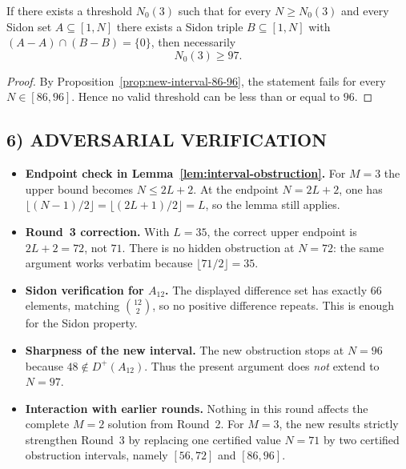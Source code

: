 \begin{corollary}[New lower bound on any eventual threshold for \(M=3\)]\label{cor:N0-lower-bound}
If there exists a threshold \(N_0(3)\) such that for every \(N\ge N_0(3)\) and every Sidon set \(A\subseteq[1,N]\) there exists a Sidon triple \(B\subseteq[1,N]\) with
\((A-A)\cap(B-B)=\{0\}\), then necessarily
\[
N_0(3)\ge 97.
\]
\end{corollary}

\begin{proof}
By Proposition~\ref{prop:new-interval-86-96}, the statement fails for every \(N\in[86,96]\).  Hence no valid threshold can be less than or equal to \(96\).
\end{proof}

\subsection{6) ADVERSARIAL VERIFICATION}
\begin{itemize}
  \item \textbf{Endpoint check in Lemma~\ref{lem:interval-obstruction}.}
  For \(M=3\) the upper bound becomes \(N\le 2L+2\).  At the endpoint \(N=2L+2\), one has
  \(\lfloor (N-1)/2\rfloor=\lfloor (2L+1)/2\rfloor=L\), so the lemma still applies.

  \item \textbf{Round~3 correction.}
  With \(L=35\), the correct upper endpoint is \(2L+2=72\), not \(71\).  There is no hidden obstruction at \(N=72\): the same argument works verbatim because \(\lfloor 71/2\rfloor=35\).

  \item \textbf{Sidon verification for \(A_{12}\).}
  The displayed difference set has exactly \(66\) elements, matching \(\binom{12}{2}\), so no positive difference repeats.  This is enough for the Sidon property.

  \item \textbf{Sharpness of the new interval.}
  The new obstruction stops at \(N=96\) because \(48\notin D^+(A_{12})\).  Thus the present argument does \emph{not} extend to \(N=97\).

  \item \textbf{Interaction with earlier rounds.}
  Nothing in this round affects the complete \(M=2\) solution from Round~2.  For \(M=3\), the new results strictly strengthen Round~3 by replacing one certified value \(N=71\) by two certified obstruction intervals, namely \([56,72]\) and \([86,96]\).
\end{itemize}

